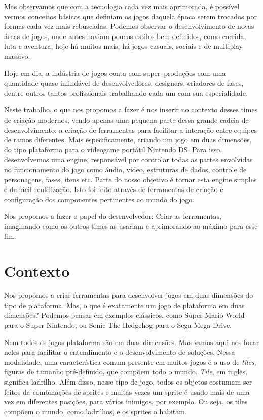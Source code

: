\documentclass[brazil]{abnt}
\begin{document}
Mas observamos que com a tecnologia cada vez mais aprimorada, é possível vermos conceitos básicos que definiam os jogos daquela época serem trocados por formas cada vez mais rebuscadas. Podemos observar o desenvolvimento de novas áreas de jogos, onde antes haviam poucos estilos bem definidos, como corrida, luta e aventura, hoje há muitos mais, há jogos casuais, sociais e de multiplay massivo.

Hoje em dia, a indústria de jogos conta com super~produções com uma quantidade quase infindável de desenvolvedores, designers, criadores de fases, dentre outros tantos profissionais trabalhando cada um com sua especialidade.

Neste trabalho, o que nos propomos a fazer é nos inserir no contexto desses times de criação modernos, vendo apenas uma pequena parte dessa grande cadeia de desenvolvimento: a criação de ferramentas para facilitar a interação entre equipes de ramos diferentes. Mais especificamente, criando um jogo em duas dimensões, do tipo plataforma para o videogame portátil Nintendo DS. Para isso, desenvolvemos uma engine, responsável por controlar todas as partes envolvidas no funcionamento do jogo como áudio, vídeo, estruturas de dados, controle de personagens, fases, itens etc. Parte do nosso objetivo é tornar esta engine  simples e de fácil reutilização. Isto foi feito através de ferramentas de criação e configuração dos componentes pertinentes ao mundo do jogo.

Nos propomos a fazer o papel do desenvolvedor: Criar as ferramentas, imaginando como os outros times as usariam e aprimorando ao máximo para esse fim.

\section{Contexto}

Nos propomos a criar ferramentas para desenvolver jogos em duas dimensões do tipo de plataforma. Mas, o que é exatamente um jogo de plataforma em duas dimensões? Podemos pensar em exemplos clássicos, como Super Mario World para o Super Nintendo, ou Sonic The Hedgehog para o Sega Mega Drive.

Nem todos os jogos plataforma são em duas dimensões. Mas vamos aqui nos focar neles para facilitar o entendimento e o desenvolvimento de soluções. Nessa modalidade, uma característica comum presente em muitos jogos é o uso de \textit{tiles}, figuras de tamanho pré-definido, que compõem todo o mundo. \textit{Tile}, em inglês, significa ladrilho. Além disso, nesse tipo de jogo, todos os objetos costumam ser feitos da combinações de sprites e muitas vezes um sprite é usado mais de uma vez em diferentes posições, para vários inimigos, por exemplo. Ou seja, os tiles compõem o mundo, como ladrilhos, e os sprites o habitam.
\end{document}
